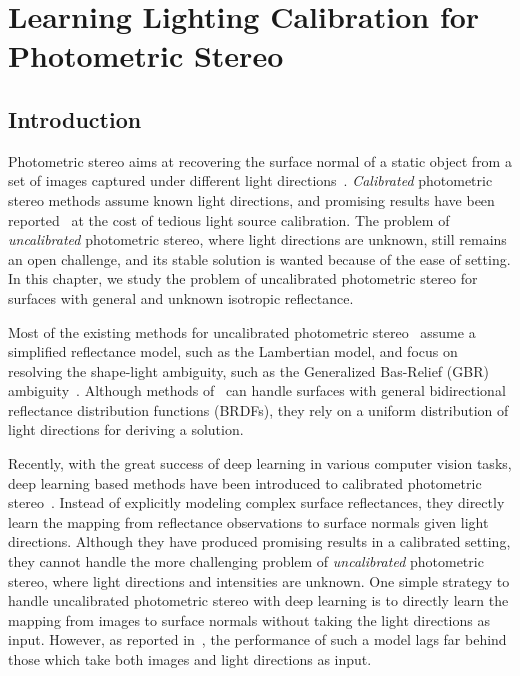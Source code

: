 \newcommand{\GCNetname}{Guided Calibration Network\xspace}
\newcommand{\gcnetname}{guided calibration network\xspace}
\newcommand{\gcnetacronymnospace}{GCNet}
\newcommand{\gcnetacronym}{\gcnetacronymnospace\xspace}
\newcommand{\gbr}{GBR\xspace}
\newcommand{\LCNetreg}{LCNet$_\text{reg}$\xspace}

\chapter{Learning Lighting Calibration for Photometric Stereo}
\label{ch:lcnet}

\section{Introduction}
Photometric stereo aims at recovering the surface normal of a static object from a set of images captured under different light directions~\cite{woodham1980ps,silver1980determining}. \emph{Calibrated} photometric stereo methods assume known light directions, and promising results have been reported~\cite{shi2019benchmark} at the cost of tedious light source calibration. The problem of \emph{uncalibrated} photometric stereo, where light directions are unknown, still remains an open challenge, and its stable solution is wanted because of the ease of setting. In this chapter, we study the problem of uncalibrated photometric stereo for surfaces with general and unknown isotropic reflectance.

Most of the existing methods for uncalibrated photometric stereo~\cite{alldrin2007r,shi2010self,papad14closed} assume a simplified reflectance model, such as the Lambertian model, and focus on resolving the shape-light ambiguity, such as the Generalized Bas-Relief (GBR) ambiguity~\cite{belhumeur1999bas}. Although methods of~\cite{lu2013uncalibrated,lu2015uncalibrated} can handle surfaces with general bidirectional reflectance distribution functions (BRDFs), they rely on a uniform distribution of light directions for deriving a solution.

Recently, with the great success of deep learning in various computer vision tasks, deep learning based methods have been introduced to calibrated photometric stereo~\cite{santo2017deep,Taniai18,ikehata2018cnn,chen2018ps}. Instead of explicitly modeling complex surface reflectances, they directly learn the mapping from reflectance observations to surface normals given light directions. Although they have produced promising results in a calibrated setting, they cannot handle the more challenging problem of \emph{uncalibrated} photometric stereo, where light directions and intensities are unknown. One simple strategy to handle uncalibrated photometric stereo with deep learning is to directly learn the mapping from images to surface normals without taking the light directions as input. 
However, as reported in~, the performance of such a model lags far behind those which take both images and light directions as input.

